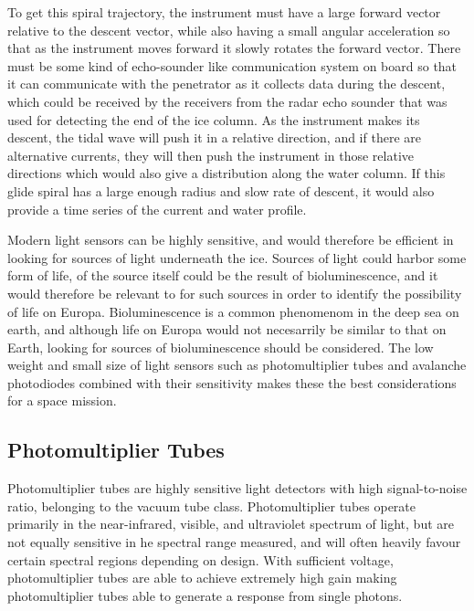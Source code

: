 To get this spiral trajectory, the instrument must have a large forward vector relative to the descent vector, while also having a small angular acceleration so that as the instrument moves forward it slowly rotates the forward vector. There must be some kind of echo-sounder like communication system on board so that it can communicate with the penetrator as it collects data during the descent, which could be received by the receivers from the radar echo sounder that was used for detecting the end of the ice column. As the instrument makes its descent, the tidal wave will push it in a relative direction, and if there are alternative currents, they will then push the instrument in those relative directions which would also give a distribution along the water column. If this glide spiral has a large enough radius and slow rate of descent, it would also provide a time series of the current and water profile.


Modern light sensors can be highly sensitive, and would therefore be efficient in looking for sources of light underneath the ice. Sources of light could harbor some form of life, of the source itself could be the result of bioluminescence, and it would therefore be relevant to for such sources in order to identify the possibility of life on Europa. Bioluminescence is a common phenomenom in the deep sea on earth, and although life on Europa would not necesarrily be similar to that on Earth, looking for sources of bioluminescence should be considered. The low weight and small size of light sensors such as photomultiplier tubes and avalanche photodiodes combined with their sensitivity makes these the best considerations for a space mission. 

\subsection{Photomultiplier Tubes}

Photomultiplier tubes are highly sensitive light detectors with high signal-to-noise ratio, belonging to the vacuum tube class. Photomultiplier tubes operate primarily in the near-infrared, visible, and ultraviolet spectrum of light, but are not equally sensitive in he spectral range measured, and will often heavily favour certain spectral regions depending on design. With sufficient voltage, photomultiplier tubes are able to achieve extremely high gain making photomultiplier tubes able to generate a response from single photons.

